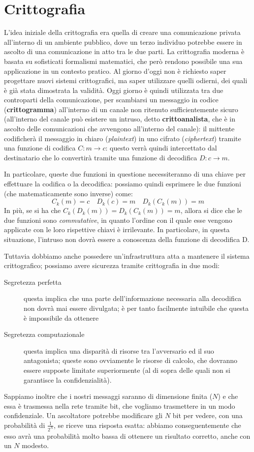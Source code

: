 \chapter{Crittografia}
L'idea iniziale della crittografia era quella di creare una comunicazione privata all'interno di 
un ambiente pubblico, dove un terzo individuo potrebbe essere in ascolto di
una comunicazione in atto tra le due parti. La crittografia moderna è basata
su sofisticati formalismi matematici, che però rendono possibile una sua
applicazione in un contesto pratico. Al giorno d'oggi non è richiesto saper
progettare nuovi sistemi crittografici, ma saper utilizzare quelli odierni,
dei quali è già stata dimostrata la validità. Oggi giorno è quindi utilizzata
tra due controparti della comunicazione, per scambiarsi un messaggio in codice
(\textbf{crittogramma}) all'interno di un canale non ritenuto sufficientemente
sicuro (all'interno del canale può esistere un intruso, detto \textbf{crittoanalista},
che è in ascolto delle comunicazioni che avvengono all'interno del canale): il 
mittente codificherà il messaggio in chiaro (\textit{plaintext}) in uno
cifrato (\textit{ciphertext}) tramite una funzione di codifica $C: m\to c$: questo
verrà quindi intercettato dal destinatario che lo convertirà tramite una funzione
di decodifica $D: c\to m$. 

In particolare, queste due funzioni in questione necessiteranno di una chiave
per effettuare la codifica o la decodifica: possiamo quindi esprimere le due
funzioni (che matematicamente sono inverse) come:
\[C_k(m)=c\quad D_k(c)=m\quad D_k(C_k(m))=m\]
In più, se si ha che $C_k(D_k(m))=D_k(C_k(m))=m$, allora si dice che le due 
funzioni sono \textit{commutative}, in quanto l'ordine con il quale esse vengono
applicate con le loro rispettive chiavi è irrilevante. In particolare, in questa
situazione, l'intruso non dovrà essere a conoscenza della funzione di decodifica
D.

Tuttavia dobbiamo anche possedere un'infrastruttura atta a mantenere 
il sistema crittografico; possiamo avere sicurezza tramite crittografia in due
modi:
\begin{description}
\item[Segretezza perfetta] questa implica che una parte dell'informazione 
	necessaria alla decodifica non dovrà mai essere divulgata; è per tanto
	facilmente intuibile che questa è impossibile da ottenere
\item[Segretezza computazionale] questa implica una disparità di risorse tra
	l'avversario ed il suo antagonista; queste sono ovviamente le risorse
	di calcolo, che dovranno essere supposte limitate superiormente (al
	di sopra delle quali non si garantisce la confidenzialità).
\end{description}
Sappiamo inoltre che i nostri messaggi saranno di dimensione finita ($N$)
e che essa è trasmessa nella rete tramite bit, che vogliamo trasmettere in
un modo confidenziale. Un ascoltatore potrebbe modificare gli $N$ bit per vedere,
con una probabilità di $\frac{1}{2^N}$, se riceve una risposta esatta: abbiamo
conseguentemente che esso avrà una probabilità molto bassa di ottenere un 
risultato corretto, anche con un $N$ modesto. 


